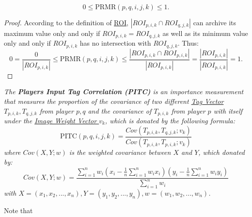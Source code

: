 \begin{lemma}
\label{lemma:prmrrange}
\begin{equation}
\label{eq:prmrrange}
0 \leq \text{PRMR}(p, q, i, j, k) \leq 1.
\end{equation}
\end{lemma}
\begin{proof}
According to the definition of \hyperref[def:roi]{ROI}, $| ROI_{p,i,k} \cap ROI_{q,j,k} |$ 
can archive its maximum value only and only if $ROI_{p,i,k} =  ROI_{q,j,k}$ 
as well as its minimum value only and only if $ROI_{p,i,k}$ has no intersection with $ROI_{q,j,k}$.
Thus:
\[
0 = \frac{0}{|ROI_{p,i,k}|} \leq \text{PRMR}(p, q, i, j, k) \leq
\frac{| ROI_{p,i,k} \cap ROI_{p,i,k} | }{|ROI_{p,i,k}|} = \frac{|ROI_{p,i,k}|}{|ROI_{p,i,k}|} = 1.
\]
\end{proof}

\begin{definition}
\label{def:pitc}
\emph{
The \textbf{Players Input Tag Correlation (PITC)} is an importance measurement that measures the proportion of
the covariance of two different \hyperref[def:tagv]{Tag Vector $T_{p,i,k}, T_{q,j,k}$} from player $p, q$ and the covariance of $T_{p,i,k}$ from player $p$ with itself under the
\hyperref[def:weightvk]{Image Weight Vector $v_k$}, which is donated by the following formula:
\begin{equation}
\text{PITC}(p, q, i, j, k) = \frac{Cov(T_{p,i,k}, T_{q,j,k}; v_k)}{Cov(T_{p,i,k}, T_{p,i,k}; v_k)}
\end{equation}
where $Cov(X, Y; w)$ is the weighted covariance between $X$ and $Y$, which donated by:
\begin{equation}
\label{eq:cov}
Cov(X, Y; w) = \frac{\sum_{i=1}^{n}{w_i(x_i-\frac{1}{n}\sum_{i=1}^{n}{w_i x_i})(y_i-\frac{1}{n}\sum_{i=1}^{n}{w_i y_i})}}{\sum_{i=1}^{n}{w_i}}
\end{equation}
with $X = (x_1, x_2, ..., x_n), Y = (y_1, y_2, ..., y_n), w = (w_1, w_2, ..., w_n)$.
}
\end{definition}

Note that

